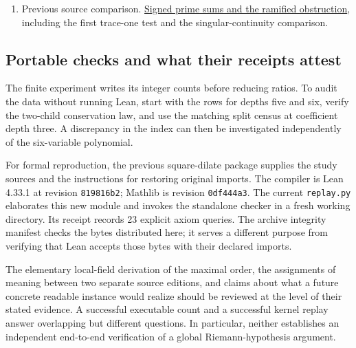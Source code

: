 \documentclass[12pt,letterpaper]{article}
\newcommand{\id}[1]{{\small\nolinkurl{#1}}}
\begin{document}
\begin{enumerate}[leftmargin=1.55em]
\item Previous source comparison. \href{https://github.com/nousentllc/riemann-hypothesis/tree/ecc4fa624abbf9010ec891a330d54b71f2e34ba5/research/uriel/experiments/upstream-interface-comparison}{Signed prime sums and the ramified obstruction}, including the first trace-one test and the singular-continuity comparison.
\end{enumerate}

\subsection{Portable checks and what their receipts attest}
The finite experiment writes its integer counts before reducing ratios. To audit the data without running Lean, start with the rows for depths five and six, verify the two-child conservation law, and use the matching split census at coefficient depth three. A discrepancy in the index can then be investigated independently of the six-variable polynomial.

For formal reproduction, the previous square-dilate package supplies the study sources and the instructions for restoring original imports. The compiler is Lean 4.33.1 at revision \id{819816b2}; Mathlib is revision \id{0df444a3}. The current \id{replay.py} elaborates this new module and invokes the standalone checker in a fresh working directory. Its receipt records 23 explicit axiom queries. The archive integrity manifest checks the bytes distributed here; it serves a different purpose from verifying that Lean accepts those bytes with their declared imports.

The elementary local-field derivation of the maximal order, the assignments of meaning between two separate source editions, and claims about what a future concrete readable instance would realize should be reviewed at the level of their stated evidence. A successful executable count and a successful kernel replay answer overlapping but different questions. In particular, neither establishes an independent end-to-end verification of a global Riemann-hypothesis argument.
\end{document}
